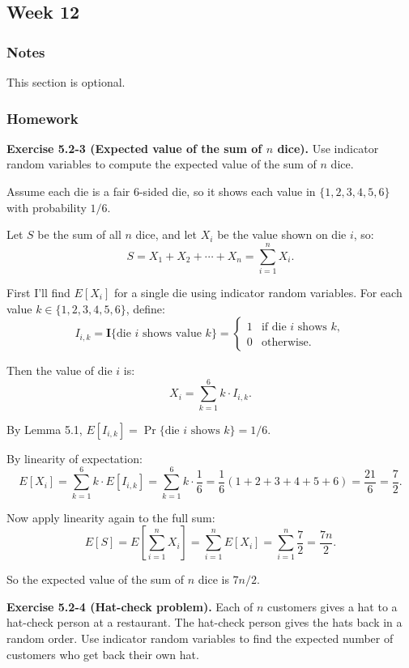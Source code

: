 \documentclass{article}
\theoremstyle{theorem}
\theoremstyle{definition}
\theoremstyle{remark}
\begin{document}
\subsection{Week 12}

\subsubsection{Notes}

This section is optional. 

\subsubsection{Homework}

\textbf{Exercise 5.2-3 (Expected value of the sum of $n$ dice).}
Use indicator random variables to compute the expected value of the sum of $n$ dice.

Assume each die is a fair 6-sided die, so it shows each value in $\{1, 2, 3, 4, 5, 6\}$ with probability $1/6$.

Let $S$ be the sum of all $n$ dice, and let $X_i$ be the value shown on die $i$, so:
\[
  S = X_1 + X_2 + \cdots + X_n = \sum_{i=1}^{n} X_i.
\]

First I'll find $E[X_i]$ for a single die using indicator random variables. For each value $k \in \{1, 2, 3, 4, 5, 6\}$, define:
\[
  I_{i,k} = \mathbf{I}\{\text{die } i \text{ shows value } k\} =
  \begin{cases}
    1 & \text{if die } i \text{ shows } k, \\
    0 & \text{otherwise.}
  \end{cases}
\]

Then the value of die $i$ is:
\[
  X_i = \sum_{k=1}^{6} k \cdot I_{i,k}.
\]

By Lemma 5.1, $E[I_{i,k}] = \Pr\{\text{die } i \text{ shows } k\} = 1/6$.

By linearity of expectation:
\[
  E[X_i] = \sum_{k=1}^{6} k \cdot E[I_{i,k}] = \sum_{k=1}^{6} k \cdot \frac{1}{6} = \frac{1}{6}(1 + 2 + 3 + 4 + 5 + 6) = \frac{21}{6} = \frac{7}{2}.
\]

Now apply linearity again to the full sum:
\[
  E[S] = E\left[\sum_{i=1}^{n} X_i\right] = \sum_{i=1}^{n} E[X_i] = \sum_{i=1}^{n} \frac{7}{2} = \frac{7n}{2}.
\]

So the expected value of the sum of $n$ dice is $7n/2$.

\bigskip

\textbf{Exercise 5.2-4 (Hat-check problem).}
Each of $n$ customers gives a hat to a hat-check person at a restaurant. The hat-check person gives the hats back in a random order. Use indicator random variables to find the expected number of customers who get back their own hat.
\end{document}
